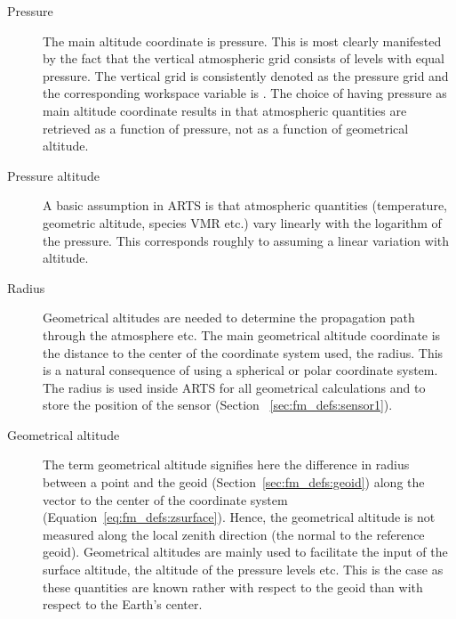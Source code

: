 \begin{description}
  
\item[Pressure] The main altitude coordinate is
  pressure. This is most clearly manifested by the fact that the
  vertical atmospheric grid consists of levels with equal pressure.
  The vertical grid is consistently denoted as the pressure grid and
  the corresponding workspace variable is . The
  choice of having pressure as main altitude coordinate results in
  that atmospheric quantities are retrieved as a function of pressure,
  not as a function of geometrical altitude.
  
\item[Pressure altitude] A basic assumption
  in ARTS is that atmospheric quantities (temperature, geometric
  altitude, species VMR etc.) vary linearly with the logarithm of the
  pressure. This corresponds roughly to assuming a linear variation
  with altitude. 
  
\item[Radius] Geometrical altitudes are
  needed to determine the propagation path through the atmosphere etc.
  The main geometrical altitude coordinate is the distance to the
  center of the coordinate system used, the radius. This is a natural
  consequence of using a spherical or polar coordinate system. The
  radius is used inside ARTS for all geometrical calculations and to
  store the position of the sensor (Section~
  \ref{sec:fm_defs:sensor1}).
  
\item[Geometrical altitude] The term
  geometrical altitude signifies here the difference in radius between
  a point and the geoid (Section~\ref{sec:fm_defs:geoid}) along the
  vector to the center of the coordinate system
  (Equation~\ref{eq:fm_defs:zsurface}). Hence, the geometrical altitude
  is not measured along the local zenith direction (the normal to the
  reference geoid). Geometrical altitudes are mainly used to
  facilitate the input of the surface altitude, the altitude of the
  pressure levels etc. This is the case as these quantities are known
  rather with respect to the geoid than with respect to the Earth's
  center.

\end{description}


